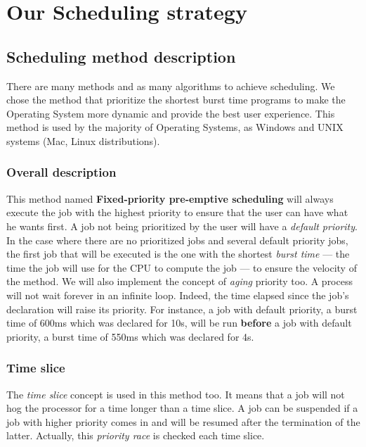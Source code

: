 \documentclass[a4paper,11pt]{article}
\begin{document}
\clearpage

\section{Our Scheduling strategy}\label{scheduling_strategy_details}

\subsection{Scheduling method description}

There are many methods and as many algorithms to achieve scheduling. We chose the method that prioritize the shortest burst time programs to make the Operating System more dynamic and provide the best user experience.
This method is used by the majority of Operating Systems, as Windows and UNIX systems (Mac, Linux distributions).

\subsubsection{Overall description}

This method named \textbf{Fixed-priority pre-emptive scheduling} will always execute the job with the highest priority to ensure that the user can have what he wants first. A job not being prioritized by the user will have a \textit{default priority}.
In the case where there are no prioritized jobs and several default priority jobs, the first job that will be executed is the one with the shortest \textit{burst time} --- the time the job will use for the CPU to compute the job --- to ensure the velocity of the method.
We will also implement the concept of \textit{aging} priority too. A process will not wait forever in an infinite loop. Indeed, the time elapsed since the job's declaration will raise its priority. For instance, a job with default priority, a burst time of 600ms which was declared for 10s, will be run \textbf{before} a job with default priority, a burst time of 550ms which was declared for 4s.

\subsubsection{Time slice}\label{scheduling_time_slice}

The \textit{time slice} concept is used in this method too. It means that a job will not hog the processor for a time longer than a time slice. A job can be suspended if a job with higher priority comes in and will be resumed after the termination of the latter. Actually, this \textit{priority race} is checked each time slice.
\end{document}
